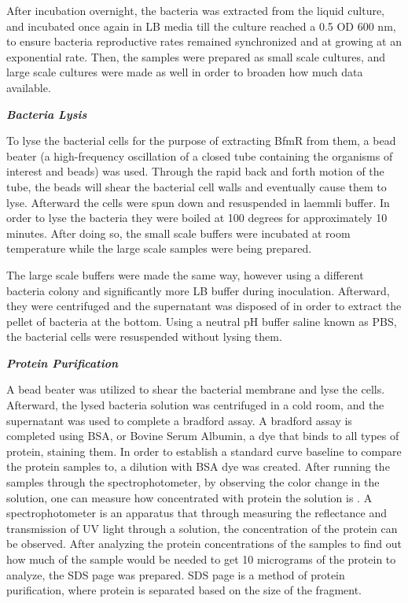 \documentclass[11pt]{article}
\begin{document}
After incubation overnight, the bacteria was extracted from the liquid culture, and incubated once again in LB media till the culture reached a 0.5 OD 600 nm, to ensure bacteria reproductive rates remained synchronized and at growing at an exponential rate. Then, the samples were prepared as small scale cultures, and large scale cultures were made as well in order to broaden how much data available. 

{\textbf {\emph{Bacteria Lysis}}}

To lyse the bacterial cells for the purpose of extracting BfmR from them, a bead beater (a high-frequency oscillation of a closed tube containing the organisms of interest and beads) was used. Through the rapid back and forth motion of the tube, the beads will shear the bacterial cell walls and eventually cause them to lyse. Afterward the cells were spun down and resuspended in laemmli buffer. In order to lyse the bacteria they were boiled at 100 degrees for approximately 10 minutes. After doing so, the small scale buffers were incubated at room temperature while the large scale samples were being prepared.

The large scale buffers were made the same way, however using a different bacteria colony and significantly more LB buffer during inoculation. Afterward, they were centrifuged and the supernatant was disposed of in order to extract the pellet of bacteria at the bottom. Using a neutral pH buffer saline known as PBS, the bacterial cells were resuspended without lysing them.

{\textbf {\emph{Protein Purification}}}

A bead beater was utilized to shear the bacterial membrane and lyse the cells. Afterward, the lysed bacteria solution was centrifuged in a cold room, and the supernatant was used to complete a bradford assay. A bradford assay is completed using BSA, or Bovine Serum Albumin, a dye that binds to all types of protein, staining them. In order to establish a standard curve baseline to compare the protein samples to, a dilution with BSA dye was created. After running the samples through the spectrophotometer, by observing the color change in the solution, one can measure how concentrated with protein the solution is \cite{spectro}. A spectrophotometer is an apparatus that through measuring the reflectance and transmission of UV light through a solution, the concentration of the protein can be observed. After analyzing the protein concentrations of the samples to find out how much of the sample would be needed to get 10 micrograms of the protein to analyze, the SDS page was prepared. SDS page is a method of protein purification, where protein is separated based on the size of the fragment.
\end{document}
